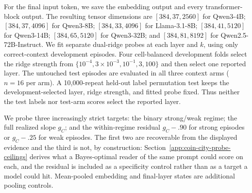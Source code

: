 For the final input token, we save the embedding output and every transformer-block
output. The resulting tensor dimensions are $[384,37,2560]$ for Qwen3-4B;
$[384,37,4096]$ for Qwen3-8B; $[384,33,4096]$ for Llama-3.1-8B;
$[384,41,5120]$ for Qwen3-14B; $[384,65,5120]$ for Qwen3-32B; and
$[384,81,8192]$ for Qwen2.5-72B-Instruct. We fit separate dual-ridge probes at
each layer and $k$, using only correct-context development episodes. Four
cell-balanced development folds select the ridge strength from
$\{10^{-4},3\!\times\!10^{-3},10^{-1},3,100\}$ and then select one reported
layer. The untouched test episodes are evaluated in all three context arms
($n=16$ per arm). A 10,000-repeat held-out label permutation test keeps the
development-selected layer, ridge strength, and fitted probe fixed. Thus neither
the test labels nor test-arm scores select the reported layer.

We probe three increasingly strict targets: the binary strong/weak regime; the
full realized slope $g_C$; and the within-regime residual
$g_C-.90$ for strong episodes or $g_C-.25$ for weak episodes. The first two are
recoverable from the displayed evidence and the third is not, by construction:
Section~\ref{app:coin-city-probe-ceilings} derives what a Bayes-optimal reader of
the same prompt could score on each, and the residual is included as a
specificity control rather than as a target a model could hit. Mean-pooled
embedding and final-layer states are additional pooling controls.

\begin{center}
\begin{minipage}{\linewidth}
\centering
{}
\label{tab:coin-city-mechanistic-summary}
\small
\setlength{\tabcolsep}{3.0pt}
\resizebox{\linewidth}{!}{}
\end{minipage}
\end{center}

\begin{center}
\begin{minipage}{\linewidth}
\centering
{}
\label{tab:coin-city-mechanistic-probe}
\scriptsize
\setlength{\tabcolsep}{2.4pt}
\resizebox{\linewidth}{!}{}
\end{minipage}
\end{center}

